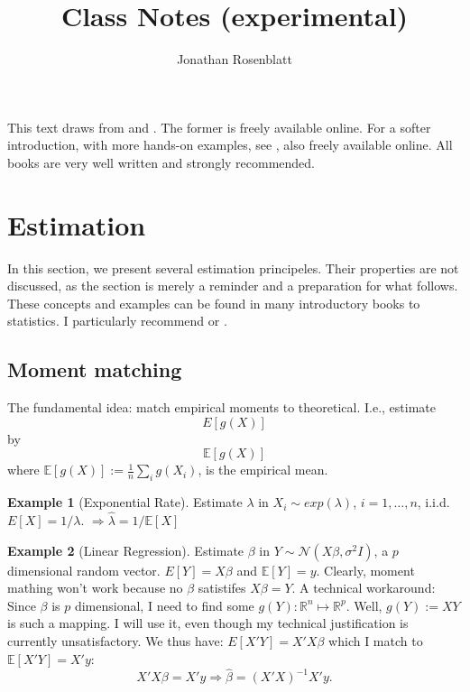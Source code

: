 \documentclass[12pt,a4paper]{article}
\author{Jonathan Rosenblatt}
\title{Class Notes (experimental)}
\theoremstyle{plain}
\theoremstyle{definition}
\newtheorem{example}{Example}
\newcommand{\expect}[1]{E\left[ #1 \right]}
\newcommand{\expectn}[1]{\mathbb{E}\left[#1\right]}
\newcommand{\gauss}[1]{\mathcal{N}\left(#1\right)}
\begin{document}
\maketitle

This text draws from \cite{hastie_elements_2003} and \cite{shalev-shwartz_understanding_2014}.
The former is freely available online.
For a softer introduction, with more hands-on examples, see \cite{james_introduction_2013}, also freely available online.
All books are very well written and strongly recommended.


\tableofcontents

\newpage

\section{Estimation}
\label{sec:estimation} 
In this section, we present several estimation principeles. 
Their properties are not discussed, as the section is merely a reminder and a preparation for what follows.
These concepts and examples can be found in many introductory books to statistics. I particularly recommend \cite{wasserman_all_2004} or \cite{abramovich_statistical_2013}.

\subsection{Moment matching}
\label{sec:moment_matching}

The fundamental idea: match empirical moments to theoretical. I.e., estimate
$$ \expect{g(X)}   $$
by 
$$ \expectn{g(X)}   $$
where $\expectn{g(X)}:=\frac{1}{n}  \sum_i g(X_i)$, is the empirical mean.

\begin{example}[Exponential Rate]

Estimate $\lambda$ in $X_i \sim exp(\lambda)$, $i=1,\dots,n$, i.i.d.
$\expect{X}=1/\lambda$.
$\Rightarrow \hat{\lambda}=1/\expectn{X}$ 

\end{example}


\begin{example}[Linear Regression]

Estimate $\beta$ in $Y \sim \gauss{X\beta,\sigma^2 I}$, a $p$ dimensional random vector.
$\expect{Y}=X\beta$ and $\expectn{Y}=y$.
Clearly, moment mathing won't work because no $\beta$ satistifes $X\beta=Y$.
A technical workaround:
Since $\beta$ is $p$ dimensional, I need to find some $g(Y): \mathbb{R}^n \mapsto \mathbb{R}^p$.
Well, $g(Y):=XY$ is such a mapping. I will use it, even though my technical justification is currently unsatisfactory. We thus have:
$\expect{X'Y}=X'X\beta$ which I match to $\expectn{X'Y}=X'y$:
$$
  X'X \beta = X' y \Rightarrow \hat{\beta}=(X'X)^{-1} X'y.
$$

\end{example}
\end{document}

